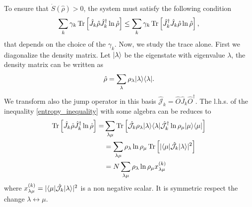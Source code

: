 To ensure that $\dot S(\hat\rho) > 0$, the system must satisfy the following condition
\begin{equation}\label{entropy_inequality}
    \sum_{k}\gamma_{k}\operatorname{Tr}\left[\hat J_{k}\hat\rho\hat J_{k}^\dagger\ln\hat\rho\right] \leq \sum_{k}\gamma_{k} \operatorname{Tr}\left[\hat J_{k}^\dagger\hat J_{k}\hat\rho\ln\hat\rho\right],
\end{equation}
that depends on the choice of the $\gamma_{k}$. 
Now, we study the trace alone.
First we diagonalize the density matrix. Let $\lvert\lambda\rangle$ be the eigenstate with eigenvalue $\lambda$, the density matrix can be written as
\begin{equation}
    \hat \rho = \sum_\lambda \rho_\lambda\lvert\lambda\rangle\langle\lambda\rvert.
\end{equation}
We transform also the jump operator in this basis $\hat{\mathcal{J}}_{k}= \hat O \hat J_{k}\hat O^\dagger$.
The l.h.s. of the inequality \eqref{entropy_inequality} with some algebra can be reduces to 
\begin{equation}
    \begin{split}
        \operatorname{Tr}\left[\hat J_{k} \hat\rho\hat J_{k}^\dagger\ln\hat\rho\right]=& \sum_{\lambda\mu}\operatorname{Tr}\left[\hat{\mathcal{J}}_{k} \rho_\lambda\lvert\lambda\rangle\langle\lambda\rvert\hat{\mathcal{J}}_{k}^\dagger\ln\rho_\mu \lvert\mu\rangle\langle\mu\rvert\right] \\
        &= \sum_{\lambda\mu}\rho_\lambda\ln\rho_\mu\operatorname{Tr}\left[|\langle\mu\rvert\hat{\mathcal{J}}_{k} \lvert\lambda\rangle|^2\right]\\
        &= N \sum_{\lambda\mu}\rho_\lambda\ln\rho_\mu x^{(k)}_{\lambda\mu}
    \end{split}
\end{equation}
where $x^{(k)}_{\lambda\mu} = |\langle\mu\rvert\hat{\mathcal{J}}_{k} \lvert\lambda\rangle|^2$ is a non negative scalar. It is symmetric respect the change $\lambda \leftrightarrow \mu$. 

